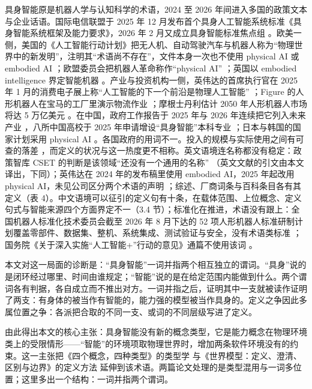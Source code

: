 \documentclass[10pt,fontset=fandol]{ctexart}
\begin{document}
具身智能原是机器人学与认知科学的术语，2024 至 2026 年间进入多国的政策文本与企业话语。国际电信联盟于 2025 年 12 月发布首个具身人工智能系统标准《具身智能系统框架及能力要求》\cite{itu2025}，2026 年 2 月又成立具身智能标准焦点组 \cite{caict2026}。欧美一侧，美国的《人工智能行动计划》把无人机、自动驾驶汽车与机器人称为“物理世界中的新发明”，注明其“术语尚不存在”，文件本身一次也不使用 physical AI 或 embodied AI \cite{aiaap2025}；欧盟委员会把机器人革命称作“physical AI” \cite{eu2025}；英国以 embodied intelligence 界定智能机器 \cite{uk2025}。产业与投资机构一侧，英伟达的首席执行官在 2025 年 1 月的消费电子展上称“人工智能的下一个前沿是物理人工智能” \cite{ces2025}；Figure 的人形机器人在宝马的工厂里演示物流作业 \cite{figure_f03}；摩根士丹利估计 2050 年人形机器人市场将达 5 万亿美元 \cite{morganstanley2025}。在中国，政府工作报告于 2025 年与 2026 年连续把它列入未来产业 \cite{govreport2025,govreport2026}，八所中国高校于 2025 年申请增设“具身智能”本科专业 \cite{yicai2025}；日本与韩国的国家计划采用 physical AI \cite{japan2026,korea2026}。各国政府的用词不一。投入的规模与实际使用之间有可查的落差 \cite{caict2026,idc2026,reuters2026}，而定义的状况与这一热度更不相称。英文语境连名称都没有稳定：政策智库 CSET 的判断是该领域“还没有一个通用的名称” \cite{cset2026}（英文文献的引文由本文译出，下同）；英伟达在 2024 年的发布稿里使用 embodied AI，2025 年起改用 physical AI，未见公司区分两个术语的声明 \cite{nvidia2024,ces2025,nvglossary}；综述、厂商词条与百科条目各有其定义（表 4）。中文语境可以征引的定义句有十条，在载体范围、上位概念、定义句式与智能来源四个方面界定不一（3.4 节）；标准化在推进，术语没有跟上：全国机器人标准化技术委员会截至 2026 年 8 月下达的 52 项人形机器人标准研制计划覆盖零部件、数据集、整机、系统集成、测试验证与安全，没有术语类标准 \cite{caict2026}；国务院《关于深入实施“人工智能+”行动的意见》通篇不使用该词 \cite{guofa2025}。

本文对这一局面的诊断是：“具身智能”一词并指两个相互独立的谓词。“具身”说的是闭环经过哪里、时间由谁规定；“智能”说的是在给定范围内能做到什么。两个谓词各有判据，各自成立而不推出对方。一词并指之后，证明其中一支就被读作证明了两支：有身体的被当作有智能的，能力强的模型被当作具身的。定义之争因此多属位置之争：各派把合取的不同一支、或词的不同层级写进了定义。

由此得出本文的核心主张：具身智能没有新的概念类型，它是能力概念在物理环境类上的受限情形——“智能”的环境项取物理世界时，增加两条软件环境没有的约束。这一主张把《四个概念，四种类型》的类型学 \cite{yu2026four} 与《世界模型：定义、澄清、区别与边界》的定义方法 \cite{yu2026wm} 延伸到该术语。两篇论文处理的是类型混用与一词多位置；这里多出一个结构：一词并指两个谓词。
\end{document}
